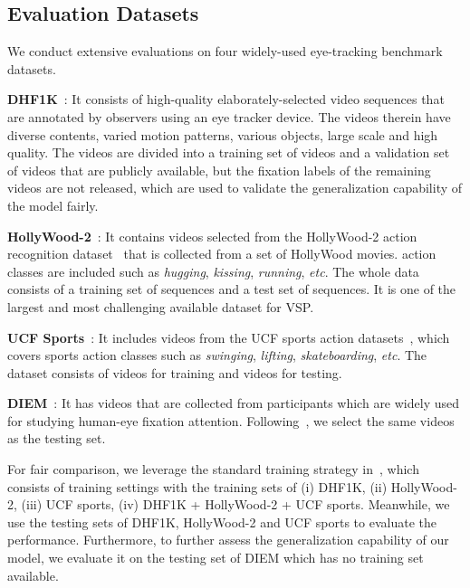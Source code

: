 \documentclass[review]{elsarticle}
\begin{document}
\subsection{Evaluation Datasets}
We conduct extensive evaluations on four widely-used eye-tracking benchmark datasets.


\textbf{DHF1K}~\cite{wang2019revisiting}: It consists of  high-quality elaborately-selected video sequences that are annotated by  observers using an eye tracker device.
The videos therein have diverse contents, varied motion patterns, various objects, large scale and high quality.
The videos are divided into a training set of  videos and a validation set of  videos that are publicly available, but the fixation labels of the remaining  videos are not released, which are used to validate the generalization capability of the model fairly.

\textbf{HollyWood-2}~\cite{mathe2014actions}: It contains  videos selected from the HollyWood-2 action recognition dataset~\cite{marszalek2009actions} that is collected from a set of  HollyWood movies.
 action classes are included such as \textit{hugging}, \textit{kissing}, \textit{running}, \textit{etc}.
The whole data consists of a training set of  sequences and a test set of  sequences.
It is one of the largest and most challenging available dataset for VSP.


\textbf{UCF Sports}~\cite{mathe2014actions}: It includes  videos from the UCF sports action datasets~\cite{rodriguez2008action}, which covers  sports action classes such as \textit{swinging}, \textit{lifting}, \textit{skateboarding}, \textit{etc}.
The dataset consists of  videos for training and  videos for testing.


\textbf{DIEM}~\cite{mital2011clustering}: It has  videos that are collected from  participants which are widely used for studying human-eye fixation attention.
Following~\cite{hossein2015many,lai2019video}, we select the same  videos as the testing set.

For fair comparison, we leverage the standard training strategy in~\cite{wang2018revisiting}, which consists of  training settings with the training sets of (i) DHF1K, (ii) HollyWood-2, (iii) UCF sports, (iv) DHF1K + HollyWood-2 + UCF sports.
Meanwhile, we use the testing sets of DHF1K, HollyWood-2 and UCF sports to evaluate the performance.
Furthermore, to further assess the generalization capability of our model, we evaluate it on the testing set of DIEM which has no training set available.
\end{document}
